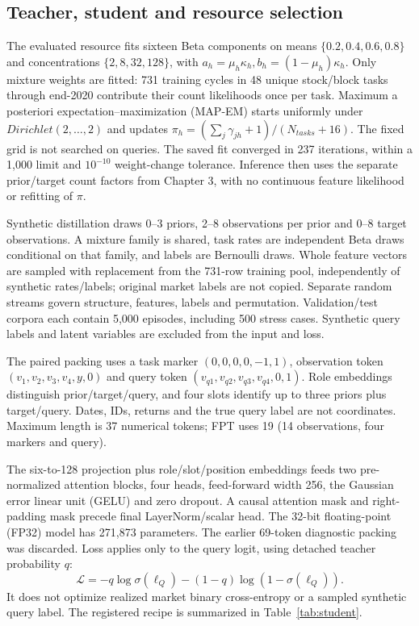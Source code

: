 \subsection{Teacher, student and resource selection}\label{s:54ebb2a16a274585}
The evaluated resource fits sixteen Beta components on means
$\{0.2,0.4,0.6,0.8\}$ and concentrations $\{2,8,32,128\}$, with
$a_h=\mu_h\kappa_h,b_h=(1-\mu_h)\kappa_h$. Only mixture weights are fitted:
731 training cycles in 48 unique stock/block tasks through end-2020
contribute their count likelihoods once per task. Maximum a posteriori expectation--maximization (MAP-EM) starts uniformly
under $Dirichlet(2,\ldots,2)$ and updates
$\pi_h=(\sum_j\gamma_{jh}+1)/(N_{tasks}+16)$. The fixed grid is not searched
on queries. The saved fit converged in 237 iterations, within a 1,000
limit and $10^{-10}$ weight-change tolerance. Inference then uses the
separate prior/target count factors from Chapter 3, with no continuous
feature likelihood or refitting of $\pi$.

Synthetic distillation draws 0--3 priors, 2--8 observations per prior and
0--8 target observations. A mixture family is shared, task rates are
independent Beta draws conditional on that family, and labels are
Bernoulli draws. Whole feature vectors are sampled with replacement from
the 731-row training pool, independently of synthetic rates/labels;
original market labels are not copied. Separate random streams govern structure, features, labels and permutation. Validation/test corpora each contain
5,000 episodes, including 500 stress cases. Synthetic query labels and
latent variables are excluded from the input and loss.

\begingroup\raggedright
The paired packing uses a task marker $(0,0,0,0,-1,1)$, observation token
$(v_1,v_2,v_3,v_4,y,0)$ and query token $(v_{q1},v_{q2},v_{q3},v_{q4},0,1)$.
Role embeddings distinguish prior/target/query, and four slots identify
up to three priors plus target/query. Dates, IDs, returns and the true
query label are not coordinates. Maximum length is 37 numerical tokens;
FPT uses 19 (14 observations, four markers and query).\par\endgroup

The six-to-128 projection plus role/slot/position embeddings feeds two
pre-normalized attention blocks, four heads, feed-forward width 256,
the Gaussian error linear unit (GELU) and zero dropout. A causal attention mask and right-padding mask
precede final LayerNorm/scalar head. The 32-bit floating-point (FP32) model has 271,873 parameters.
The earlier 69-token diagnostic packing was discarded. Loss applies
only to the query logit, using detached teacher probability $q$:
\begin{equation}
\mathcal L=-q\log\sigma(\ell_Q)-(1-q)\log(1-\sigma(\ell_Q)).
\end{equation}
It does not optimize realized market binary cross-entropy or a sampled synthetic query
label. The registered recipe is summarized in Table~\ref{tab:student}.

